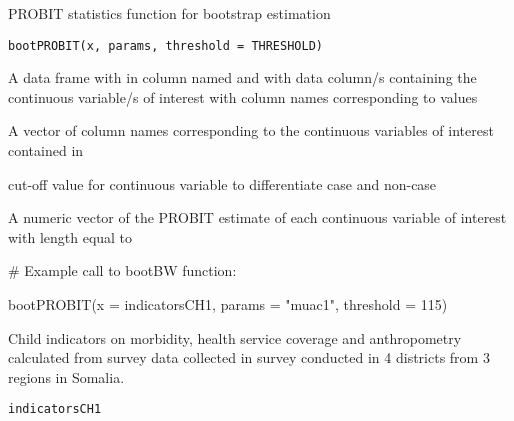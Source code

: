 \documentclass[a4paper]{book}
\begin{document}
%
\begin{Description}\relax
PROBIT statistics function for bootstrap estimation
\end{Description}
%
\begin{Usage}
\begin{verbatim}
bootPROBIT(x, params, threshold = THRESHOLD)
\end{verbatim}
\end{Usage}
%
\begin{Arguments}
\begin{ldescription}
\item[\code{x}] A data frame with  in column named
 and with data column/s containing the continuous variable/s of
interest with column names corresponding to  values

\item[\code{params}] A vector of column names corresponding to the continuous
variables of interest contained in 

\item[\code{threshold}] cut-off value for continuous variable to differentiate
case and non-case
\end{ldescription}
\end{Arguments}
%
\begin{Value}
A numeric vector of the PROBIT estimate of each continuous variable
of interest with length equal to 
\end{Value}
%
\begin{Examples}
\begin{ExampleCode}

# Example call to bootBW function:

bootPROBIT(x = indicatorsCH1,
           params = "muac1",
           threshold = 115)

\end{ExampleCode}
\end{Examples}
%
\begin{Description}\relax
Child indicators on morbidity, health service coverage and anthropometry
calculated from survey data collected in survey conducted in 4 districts
from 3 regions in Somalia.
\end{Description}
%
\begin{Usage}
\begin{verbatim}
indicatorsCH1
\end{verbatim}
\end{Usage}
\end{document}
